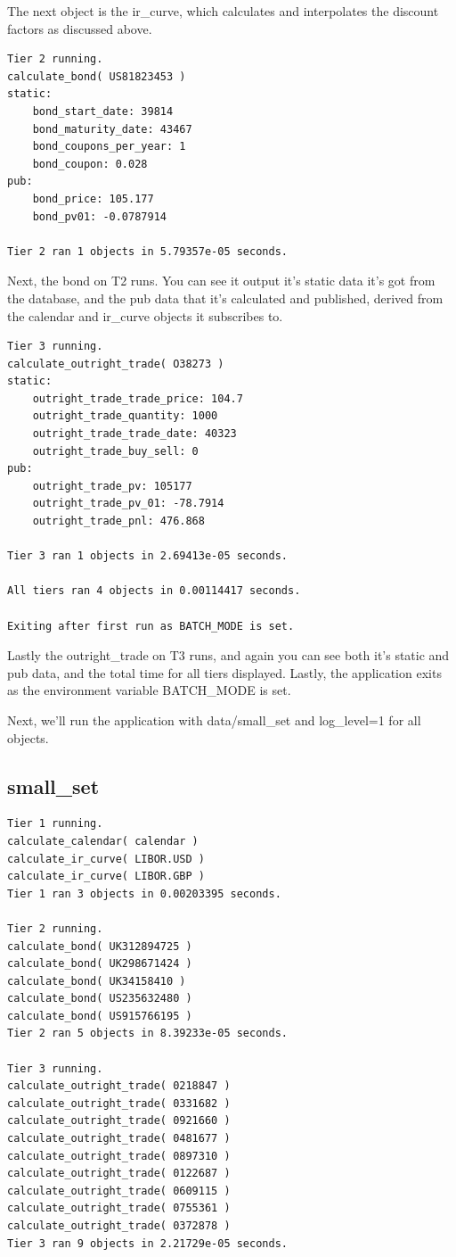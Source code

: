 \documentclass{report}
\begin{document}
The next object is the ir_curve, which calculates and interpolates the discount factors as discussed above.

\begin{verbatim}
Tier 2 running.
calculate_bond( US81823453 )
static:
    bond_start_date: 39814
    bond_maturity_date: 43467
    bond_coupons_per_year: 1
    bond_coupon: 0.028
pub:
    bond_price: 105.177
    bond_pv01: -0.0787914

Tier 2 ran 1 objects in 5.79357e-05 seconds.
\end{verbatim}

Next, the bond on T2 runs. You can see it output it's static data it's got from the database, and the pub data that it's calculated and published, derived from the calendar and ir_curve objects it subscribes to.

\begin{verbatim}
Tier 3 running.
calculate_outright_trade( O38273 )
static:
    outright_trade_trade_price: 104.7
    outright_trade_quantity: 1000
    outright_trade_trade_date: 40323
    outright_trade_buy_sell: 0
pub:
    outright_trade_pv: 105177
    outright_trade_pv_01: -78.7914
    outright_trade_pnl: 476.868

Tier 3 ran 1 objects in 2.69413e-05 seconds.

All tiers ran 4 objects in 0.00114417 seconds.

Exiting after first run as BATCH_MODE is set.
\end{verbatim}

Lastly the outright_trade on T3 runs, and again you can see both it's static and pub data, and the total time for all tiers displayed. Lastly, the application exits as the environment variable BATCH_MODE is set.

Next, we'll run the application with data/small_set and log_level=1 for all objects.

\subsection{small_set}

\begin{verbatim}
Tier 1 running.
calculate_calendar( calendar )
calculate_ir_curve( LIBOR.USD )
calculate_ir_curve( LIBOR.GBP )
Tier 1 ran 3 objects in 0.00203395 seconds.

Tier 2 running.
calculate_bond( UK312894725 )
calculate_bond( UK298671424 )
calculate_bond( UK34158410 )
calculate_bond( US235632480 )
calculate_bond( US915766195 )
Tier 2 ran 5 objects in 8.39233e-05 seconds.

Tier 3 running.
calculate_outright_trade( 0218847 )
calculate_outright_trade( 0331682 )
calculate_outright_trade( 0921660 )
calculate_outright_trade( 0481677 )
calculate_outright_trade( 0897310 )
calculate_outright_trade( 0122687 )
calculate_outright_trade( 0609115 )
calculate_outright_trade( 0755361 )
calculate_outright_trade( 0372878 )
Tier 3 ran 9 objects in 2.21729e-05 seconds.
\end{verbatim}
\end{document}
